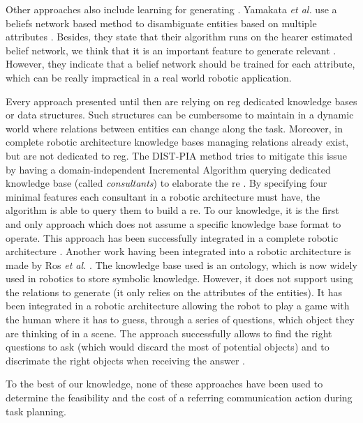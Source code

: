 \documentclass[a4paper,11pt,twoside]{StyleThese}
\begin{document}
Other approaches also include learning for generating . Yamakata \textit{et al.} use a beliefs network based method to disambiguate entities based on multiple attributes \cite{yamakata2004belief}. Besides, they state that their algorithm runs on the hearer estimated belief network, we think that it is an important feature to generate relevant . However, they indicate that a belief network should be trained for each attribute, which can be really impractical in a real world robotic application.

Every approach presented until then are relying on \acrshort{reg} dedicated knowledge bases or data structures. Such structures can be cumbersome to maintain in a dynamic world where relations between entities can change along the task. Moreover, in complete robotic architecture knowledge bases managing relations already exist, but are not dedicated to \acrshort{reg}. The DIST-PIA method tries to mitigate this issue by having a domain-independent Incremental Algorithm querying dedicated knowledge base (called \textit{consultants}) to elaborate the \acrshort{re} \cite{williams2017referring}. By specifying four minimal features each consultant in a robotic architecture must have, the algorithm is able to query them to build a \acrshort{re}. To our knowledge, it is the first and only approach which does not assume a specific knowledge base format to operate. This approach has been successfully integrated in a complete robotic architecture \cite{williams2019dempster}. Another work having been integrated into a robotic architecture is made by Ros \textit{et al.} \cite{ros2010one}. The knowledge base used is an ontology, which is now widely used in robotics to store symbolic knowledge. However, it does not support using the relations to generate  (it only relies on the attributes of the entities). It has been integrated in a robotic architecture allowing the robot to play a game with the human where it has to guess, through a series of questions, which object they are thinking of in a scene. The approach successfully allows to find the right questions to ask (which would discard the most of potential objects) and to discrimate the right objects when receiving the answer \cite{lemaignan2012grounding}.

To the best of our knowledge, none of these approaches have been used to determine the feasibility and the cost of a referring communication action during task planning.
\end{document}
